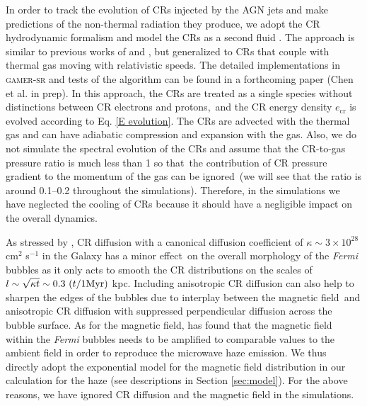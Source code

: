 \documentclass[fleqn,usenatbib,useAMS]{mnras}
\begin{document}
  In order to track the evolution of CRs injected by the AGN jets and make predictions of the non-thermal radiation they produce, we adopt the CR hydrodynamic formalism and model the CRs as a second fluid \citep{Zweibel2013}. The approach is similar to previous works of \cite{Guo2012} and \cite{Yang2012}, but generalized to CRs that couple with thermal gas moving with relativistic speeds. The detailed implementations in \textsc{gamer-sr} and tests of the algorithm can be found in a forthcoming paper (Chen et al. in prep). In this approach, the CRs are treated as a single species without distinctions between CR electrons and protons,\
  and the CR energy density $e_{\text{cr}}$ is evolved according to Eq. \ref{E evolution}.
  The CRs are advected with the thermal gas and can have adiabatic compression and expansion with the gas. Also, we do not simulate the spectral evolution of the CRs and assume that the CR-to-gas pressure ratio is much less than 1 so that\
  the contribution of CR pressure gradient to the momentum of the gas can be ignored\
  (we will see that the ratio is around 0.1--0.2 throughout the simulations). %
Therefore, in the simulations we have neglected the cooling of CRs because it should have a negligible impact on the overall dynamics.

  As stressed by \citet{Yang2012}, CR diffusion with a canonical diffusion coefficient of $\kappa \sim 3\times 10^{28}$ cm$^2$ s$^{-1}$ in the Galaxy has a minor effect\
  on the overall morphology of the \textit{Fermi} bubbles as it
  only acts to smooth the CR distributions on the scales of $l \sim \sqrt{\kappa t} \sim 0.3\ (t/1 {\rm Myr})$ kpc. Including anisotropic CR diffusion can also help to sharpen the edges of the bubbles due to interplay between the magnetic field\
  and anisotropic CR diffusion with suppressed perpendicular diffusion across the bubble surface. As for the magnetic field, \cite{Yang2013} has found that the magnetic field within the \textit{Fermi} bubbles needs to be amplified to comparable values to the ambient field in order to reproduce the microwave haze emission. We thus directly adopt the exponential model for the magnetic field distribution in our calculation for the haze (see descriptions in Section \ref{sec:model}).
   For the above reasons, we have ignored CR diffusion and the magnetic field in the simulations.\
\end{document}
